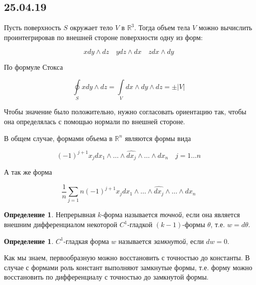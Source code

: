 \documentclass[a5paper]{article}
\newcounter{through}
\theoremstyle{plain}
\theoremstyle{definition}
\newtheorem{definition}[through]{Определение}
\numberwithin{through}{section}
\numberwithin{equation}{section}
\begin{document}


\subsection{25.04.19}

Пусть поверхность $S$ окружает тело $V$ в $\mathbb{R}^3$. Тогда объем тела $V$ можно вычислить проинтегрировав по внешней стороне поверхности одну из форм:

\begin{equation*}
	xdy \wedge dz \quad ydz \wedge dx \quad zdx \wedge dy
\end{equation*}

По формуле Стокса

\begin{equation*}
	\oint\limits_{S} xdy \wedge dz = \int\limits_{V} dx \wedge dy \wedge dz = \pm |V|
\end{equation*}

Чтобы значение было положительно, нужно согласовать ориентацию так, чтобы она определялась с помощью нормали по внешней стороне.

В общем случае, формами объема в $\mathbb{R}^n$ являются формы вида 

\begin{equation*}
	(-1)^{j+1}x_j dx_1 \wedge \ldots \wedge \widehat{dx_j} \wedge \ldots \wedge dx_n \quad j = 1 \ldots n
\end{equation*}

А так же форма

\begin{equation*}
	\frac{1}{n} \sum\limits_{j=1}{n} (-1)^{j+1}x_j dx_1 \wedge \ldots \wedge \widehat{dx_j} \wedge \ldots \wedge dx_n
\end{equation*}

\begin{definition}
	Непрерывная $k$-форма называется \textit{точной}, если она является внешним дифференциалом некоторой $C^1$-гладкой $(k-1)$-формы $\theta$, т.е. $w = d \theta$.
\end{definition}

\begin{definition}
	$C^1$-гладкая форма $w$ называется \textit{замкнутой}, если $dw=0$.
\end{definition}

Как мы знаем, первообразную можно восстановить с точностью до константы. В случае с формами роль констант выполняют замкнутые формы, т.е. форму можно восстановить по дифференциалу с точностью до замкнутой формы.
\end{document}

